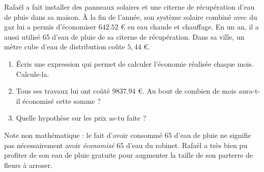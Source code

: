 
\begin{exercice}\label{exosmath-0733}

    Rafaël a fait installer des panneaux solaires et une citerne de récupération d'eau de pluie dans sa maison. À la fin de l'année, son système solaire combiné avec du gaz lui a permis d'économiser $642.52$ € en eau chaude et chauffage. En un an, il a aussi utilisé \unit{65}{\cubic\meter} d'eau de pluie de sa citerne de récupération.  Dans sa ville, un mètre cube d'eau de distribution coûte $5,44$ €.
    
    \begin{enumerate}
        \item
            
    Écris une expression qui permet de calculer l'économie réalisée chaque mois. Calcule-la.  
    
\item
     Tous ses travaux lui ont coûté $9 837.94$ €. Au bout de combien de mois aura-t-il économisé cette somme ?
    
 \item
     Quelle hypothèse sur les prix as-tu faite ?
    \end{enumerate}

    Note non mathématique : le fait d'avoir consommé \unit{65}{\cubic\meter} d'eau de pluie ne signifie pas nécessairement avoir \emph{économisé} \unit{65}{\cubic\meter} d'eau du robinet. Rafaël a très bien pu profiter de son eau de pluie gratuite pour augmenter la taille de son parterre de fleurs à arroser.

\end{exercice}
